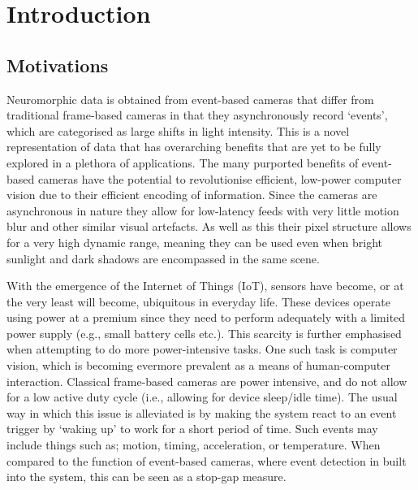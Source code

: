\chapter{Introduction} \setcounter{page}{1}

\section{Motivations}

Neuromorphic data is obtained from event-based cameras that differ from traditional frame-based cameras in that they asynchronously record `events', which are categorised as large shifts in light intensity. This is a novel representation of data that has overarching benefits that are yet to be fully explored in a plethora of applications. The many purported benefits of event-based cameras have the potential to revolutionise efficient, low-power computer vision due to their efficient encoding of information. Since the cameras are asynchronous in nature they allow for low-latency feeds with very little motion blur and other similar visual artefacts. As well as this their pixel structure allows for a very high dynamic range, meaning they can be used even when bright sunlight and dark shadows are encompassed in the same scene.

With the emergence of the Internet of Things (IoT), sensors have become, or at the very least will become, ubiquitous in everyday life. These devices operate using power at a premium since they need to perform adequately with a limited power supply (e.g., small battery cells etc.). This scarcity is further emphasised when attempting to do more power-intensive tasks. One such task is computer vision, which is becoming evermore prevalent as a means of human-computer interaction. Classical frame-based cameras are power intensive, and do not allow for a low active duty cycle (i.e., allowing for device sleep/idle time). The usual way in which this issue is alleviated is by making the system react to an event trigger by `waking up' to work for a short period of time. Such events may include things such as; motion, timing, acceleration, or temperature. When compared to the function of event-based cameras, where event detection in built into the system, this can be seen as a stop-gap measure.

